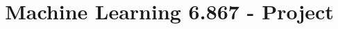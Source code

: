 \documentclass[twoside,11pt]{article}
\begin{document}
\title{Machine Learning 6.867 - Project}

\maketitle








\nocite{*}

\end{document}
